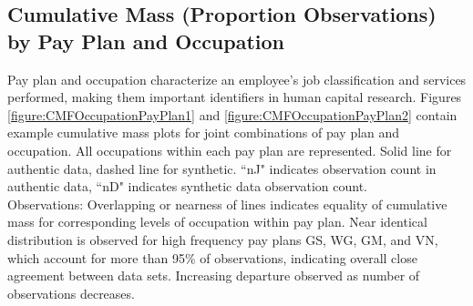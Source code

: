 \documentclass[10pt, letterpaper]{article}
\begin{document}
\begin{spacing}{1.0}
\clearpage

\section{Cumulative Mass (Proportion Observations) by Pay Plan and Occupation}

Pay plan and occupation characterize an employee's job classification and services performed, making them important identifiers in human capital research.  Figures \ref{figure:CMFOccupationPayPlan1} and \ref{figure:CMFOccupationPayPlan2} contain example cumulative mass plots for joint combinations of pay plan and occupation.  All occupations within each pay plan are represented.  Solid line for authentic data, dashed line for synthetic.  ``nJ" indicates observation count in authentic data, ``nD" indicates synthetic data observation count.\\

Observations:  Overlapping or nearness of lines indicates equality of cumulative mass for corresponding levels of occupation within pay plan.  Near identical distribution is observed for high frequency pay plans GS, WG, GM, and VN, which account for more than 95\% of observations, indicating overall close agreement between data sets.  Increasing departure observed as number of observations decreases.\\


\end{spacing}
\end{document}
